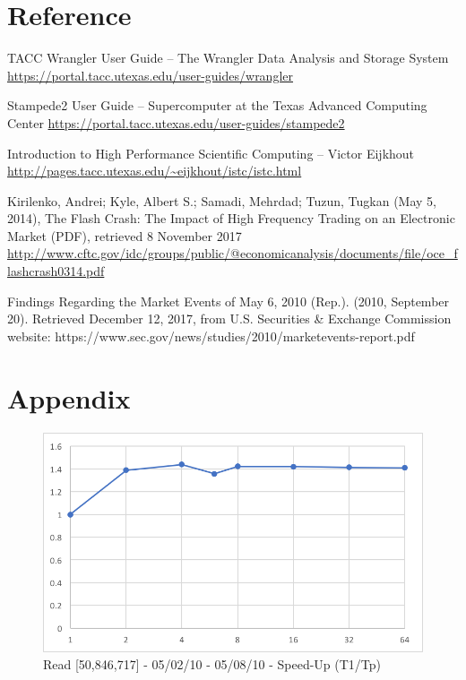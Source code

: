 \documentclass[12pt]{article} %
\begin{document}

\newpage

\section{Reference}

\begin{flushleft}

TACC Wrangler User Guide  -- The Wrangler Data Analysis and Storage System \url{https://portal.tacc.utexas.edu/user-guides/wrangler}

Stampede2 User Guide -- Supercomputer at the Texas Advanced Computing Center \url{https://portal.tacc.utexas.edu/user-guides/stampede2}

Introduction to High Performance Scientific Computing -- Victor Eijkhout \\ \url{http://pages.tacc.utexas.edu/~eijkhout/istc/istc.html}

Kirilenko, Andrei; Kyle, Albert S.; Samadi, Mehrdad; Tuzun, Tugkan (May 5, 2014), The Flash Crash: The Impact of High Frequency Trading on an Electronic Market (PDF), retrieved 8 November 2017 \\ \url{http://www.cftc.gov/idc/groups/public/@economicanalysis/documents/file/oce_flashcrash0314.pdf}

Findings Regarding the Market Events of May 6, 2010 (Rep.). (2010, September 20). Retrieved December 12, 2017, from U.S. Securities \& Exchange Commission website: https://www.sec.gov/news/studies/2010/marketevents-report.pdf

\end{flushleft}

\newpage

\section{Appendix}

\begin{figure}[htb]
\caption{Read [50,846,717] - 05/02/10 - 05/08/10 - Speed-Up (T1/Tp)}\label{fig:benchmark01}
\centering
\includegraphics[width=15cm,keepaspectratio]{imgs/img01.png}
\end{figure} 
\end{document}
